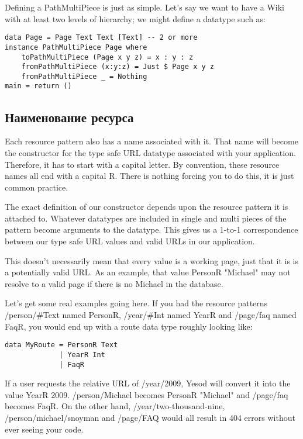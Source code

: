 Defining a PathMultiPiece is just as simple. Let's say we want to have a Wiki with at least two levels of hierarchy; we might define a datatype such as:

\begin{lstlisting}
data Page = Page Text Text [Text] -- 2 or more
instance PathMultiPiece Page where
    toPathMultiPiece (Page x y z) = x : y : z
    fromPathMultiPiece (x:y:z) = Just $ Page x y z
    fromPathMultiPiece _ = Nothing
main = return ()
\end{lstlisting}

\subsection{Наименование ресурса}

Each resource pattern also has a name associated with it. That name
will become the constructor for the type safe URL datatype associated
with your application. Therefore, it has to start with a capital
letter. By convention, these resource names all end with a capital
R. There is nothing forcing you to do this, it is just common
practice.

The exact definition of our constructor depends upon the resource
pattern it is attached to. Whatever datatypes are included in single
and multi pieces of the pattern become arguments to the datatype. This
gives us a 1-to-1 correspondence between our type safe URL values and
valid URLs in our application.

This doesn't necessarily mean that every value is a working page, just
that it is is a potentially valid URL. As an example, that value
PersonR "Michael" may not resolve to a valid page if there is no
Michael in the database.

Let's get some real examples going here. If you had the resource
patterns /person/\#Text named PersonR, /year/\#Int named YearR and
/page/faq named FaqR, you would end up with a route data type roughly
looking like:

\begin{lstlisting}
data MyRoute = PersonR Text
             | YearR Int
             | FaqR
\end{lstlisting}

If a user requests the relative URL of /year/2009, Yesod will convert
it into the value YearR 2009. /person/Michael becomes PersonR
"Michael" and /page/faq becomes FaqR. On the other hand,
/year/two-thousand-nine, /person/michael/snoyman and /page/FAQ would
all result in 404 errors without ever seeing your code.

